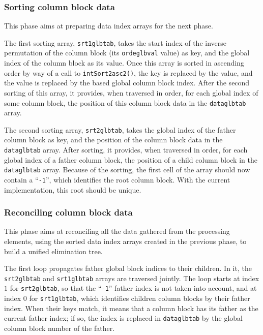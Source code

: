 \subsubsection{Sorting column block data}

This phase aims at preparing data index arrays for the next phase.

The first sorting array, \texttt{srt1\lbt glb\lbt tab}, takes
the start index of the inverse permutation of the column block (its
\texttt{ordeglb\lbt val} value) as key, and the global index of the
column block as its value. Once this array is sorted in ascending
order by way of a call to \texttt{intSort2\lbt asc2()}, the key is
replaced by the value, and the value is replaced by the based global
column block index. After the second sorting of this array, it
provides, when traversed in order, for each global index of some
column block, the position of this column block data in the
\texttt{dataglbtab} array.

The second sorting array, \texttt{srt2\lbt glb\lbt tab}, takes the
global index of the father column block as key, and the position
of the column block data in the \texttt{dataglbtab} array. After
sorting, it provides, when traversed in order, for each global index
of a father column block, the position of a child column block in the
\texttt{dataglbtab} array. Because of the sorting, the first cell of
the array should now contain a ``\texttt{-1}'', which identifies the
root column block. With the current implementation, this root should
be unique.

\subsubsection{Reconciling column block data}

This phase aims at reconciling all the data gathered from the
processing elements, using the sorted data index arrays created in the
previous phase, to build a unified elimination tree.

The first loop propagates father global block indices to their
children. In it, the \texttt{srt2glbtab} and \texttt{srt1glbtab}
arrays are traversed jointly. The loop starts at index $1$ for
\texttt{srt2glbtab}, so that the ``\texttt{-1}'' father index is not
taken into account, and at index $0$ for \texttt{srt1glbtab}, which
identifies children column blocks by their father index.
When their keys match, it means that a column block has its father as
the current father index; if so, the index is replaced in
\texttt{dataglbtab} by the global column block number of the father.

